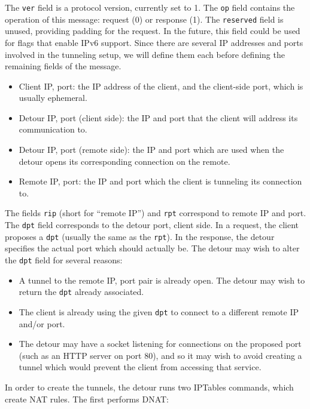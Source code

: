 \documentclass{cwru}
\begin{document}
The \texttt{ver} field is a protocol version, currently set to 1. The
\texttt{op} field contains the operation of this message: request (0) or
response (1). The \texttt{reserved} field is unused, providing padding for the
request. In the future, this field could be used for flags that enable IPv6
support. Since there are several IP addresses and ports involved in the
tunneling setup, we will define them each before defining the remaining fields
of the message.

\begin{itemize}
\item Client IP, port: the IP address of the client, and the client-side port,
  which is usually ephemeral.
\item Detour IP, port (client side): the IP and port that the client will
  address its communication to.
\item Detour IP, port (remote side): the IP and port which are used when the
  detour opens its corresponding connection on the remote.
\item Remote IP, port: the IP and port which the client is tunneling its
  connection to.
\end{itemize}

The fields \texttt{rip} (short for ``remote IP'') and \texttt{rpt} correspond to
remote IP and port. The \texttt{dpt} field corresponds to the detour port,
client side. In a request, the client proposes a \texttt{dpt} (usually the same
as the \texttt{rpt}). In the response, the detour specifies the actual port
which should actually be. The detour may wish to alter the \texttt{dpt} field
for several reasons:

\begin{itemize}
\item A tunnel to the remote IP, port pair is already open. The detour may wish
  to return the \texttt{dpt} already associated.
\item The client is already using the given \texttt{dpt} to connect to a
  different remote IP and/or port.
\item The detour may have a socket listening for connections on the proposed
  port (such as an HTTP server on port 80), and so it may wish to avoid creating
  a tunnel which would prevent the client from accessing that service.
\end{itemize}

In order to create the tunnels, the detour runs two IPTables commands, which
create NAT rules. The first performs DNAT:
\end{document}
